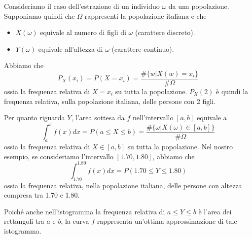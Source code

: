 \begin{example}
	Consideriamo il caso dell'estrazione di un individuo $\omega$ da una popolazione. Supponiamo
	quindi che $\Omega$ rappresenti la popolazione italiana e che
	\begin{itemize}
		\item $X(\omega)$ equivale al numero di figli di $\omega$ (carattere discreto).
		\item $Y(\omega)$ equivale all'altezza di $\omega$ (carattere continuo).
	\end{itemize}
	Abbiamo che
	\[ P_X(x_i) = P(X = x_i) = \frac{\# \{ w | X(w) = x_i\} }{\# \Omega} \]
	ossia la frequenza relativa di $X = x_i$ su tutta la popolazione. $P_X(2)$ è quindi la
	frequenza relativa, sulla popolazione italiana, delle persone con 2 figli.

	Per quanto riguarda $Y$, l'area sottesa da $f$ nell'intervallo $[a,b]$ equivale a
	\[
		\int_a^b f(x) dx = P (a \leq X \leq b)
		= \frac{\# \{ \omega | X(\omega) \in [a,b] \}}{\# \Omega}
	\]
	ossia la frequenza relativa di $X \in [a,b]$ su tutta la popolazione. Nel nostro esempio, se
	consideriamo l'intervallo $[1.70, 1.80]$, abbiamo che
	\[ \int_{1.70}^{1.80} f(x) dx = P (1.70 \leq Y \leq 1.80) \]
	ossia la frequenza relativa, nella popolazione italiana, delle persone con altezza compresa tra
	1.70 e 1.80.

	Poiché anche nell'istogramma la frequenza relativa di $a \leq Y \leq b$ è l'area dei rettangoli
	tra $a$ e $b$, la curva $f$ rappresenta un'ottima approssimazione di tale istogramma.
\end{example}